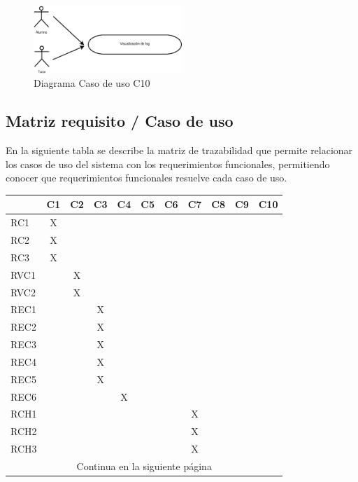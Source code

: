 \begin{figure}[h]
	\centering
	\includegraphics[width=0.5\textwidth]{./img/c3-cu10.eps}
	\caption{Diagrama Caso de uso C10}
\end{figure}

\vspace{2cm}

\subsection{Matriz requisito / Caso de uso}

En la siguiente tabla se describe la matriz de trazabilidad que permite relacionar los casos de uso del sistema con los requerimientos funcionales, permitiendo conocer que requerimientos funcionales resuelve cada caso de uso.

\begin{table}[h]
\centering
\begin{tabular}{ | l | c | c | c | c | c | c | c | c | c | c |}
	\hline
	 & C1 & C2 & C3 &C4 & C5 & C6 & C7 & C8 & C9 & C10 \\
	\hline
	RC1 & X & & & & & & & & & \\
	\hline
	RC2 & X & & & & & & & & &  \\
	\hline
	RC3 & X & & & & & & & & &  \\
	\hline
	RVC1 & & X & & & & & & & &  \\
	\hline
	RVC2 & & X & & & & & & & &  \\
	\hline
	REC1 & & & X & & & & & & &  \\
	\hline
	REC2 & & & X & & & & & & &  \\
	\hline
	REC3 & & & X & & & & & & &  \\
	\hline
	REC4 & & & X & & & & & & &  \\
	\hline
	REC5 & & & X & & & & & & &  \\
	\hline
	REC6 & & & & X & & & & & &  \\
	\hline
	RCH1 & & & & & & & X & & &  \\
	\hline
	RCH2 & & & & & & & X & & &  \\
	\hline
	RCH3 & & & & & & & X & & &  \\
	\hline
	\multicolumn{11}{|c|}{Continua en la siguiente página} \\
	\hline
\end{tabular}
\end{table}


